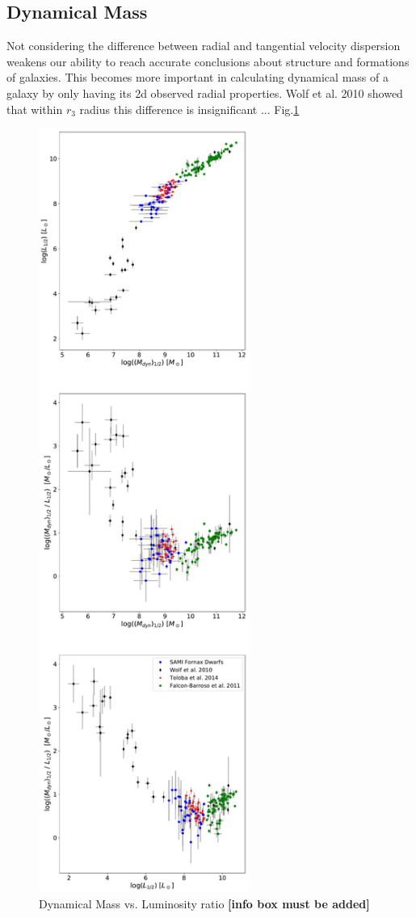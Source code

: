 \documentclass{aa}
\begin{document}
\subsection{Dynamical Mass}
Not considering the difference between radial and tangential velocity dispersion weakens our ability to reach accurate conclusions about structure and formations of galaxies. This becomes more important in calculating dynamical mass of a galaxy by only having its 2d observed radial properties. Wolf et al. 2010 showed that within $r_3$ radius this difference is insignificant ...
Fig.\ref{fig:ML}

\begin{figure}[!htb]
   \centering
   \includegraphics[height=25cm]{../2_pipeline/2_MassDyn_Luminosity+Liter/DyM-L+Liter_DWARF.pdf}   		
  	 \caption{Dynamical Mass vs. Luminosity ratio \textbf{[info box must be added]}}
         \label{fig:ML}
\end{figure}
\end{document}
